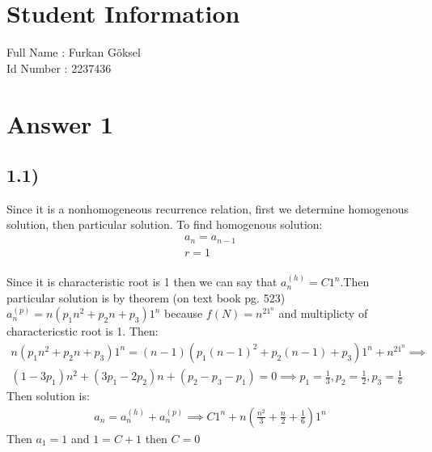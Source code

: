 \documentclass[12pt]{article}
\begin{document}
\section*{Student Information } 
Full Name : Furkan Göksel \\
Id Number :  2237436 \\

\section*{Answer 1}
\subsection*{1.1)}
Since it is a nonhomogeneous recurrence relation, first we determine homogenous solution, then particular solution. To find homogenous solution:
\begin{equation} 
\begin{split} 
    a_n = a_{n-1} \\
    r=1
\end{split}
\end{equation} \\ 
Since it is characteristic root is 1 then we can say that $a_n^{(h)} = C1^n$.Then particular solution is by theorem (on text book pg. 523) $a^{(p)}_n=n(p_1n^2+p_2n+p_3)1^n$ because $f(N)=n^21^n$ and multiplicty of charactericstic root is 1. Then:
\begin{equation} 
\begin{split} 
    n(p_1n^2+p_2n+p_3)1^n = (n-1)(p_1(n-1)^2+p_2(n-1)+p_3)1^n+n^21^n\implies \\
     (1-3p_1)n^2+(3p_1-2p_2)n+(p_2-p_3-p_1)=0 \implies p_1=\frac{1}{3},p_2=\frac{1}{2},p_3=\frac{1}{6}
\end{split}
\end{equation} 
Then solution is:   
\begin{equation} 
\begin{split} 
    a_n = a_n^{(h)}+a_n^{(p)} \implies C1^n+n(\frac{n^2}{3}+\frac{n}{2}+\frac{1}{6})1^n
\end{split}
\end{equation} 
Then $a_1 = 1$ and $1=C+1$ then $C=0$
\end{document}
